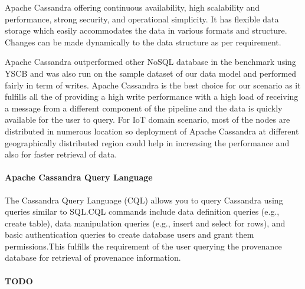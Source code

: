 Apache Cassandra offering continuous availability, high scalability and performance, strong security, and operational simplicity. It has flexible data storage which easily accommodates the data in various formats and structure. Changes can be made dynamically to the data structure as per requirement.


Apache Cassandra outperformed other NoSQL database in the benchmark using YSCB and was also run on the sample dataset of our data model and performed fairly in term of writes. 
Apache Cassandra is the best choice for our scenario as it fulfills all the of providing a high write performance with a high load of receiving a message from a different component of the pipeline and the data is quickly available for the user to query. For IoT domain scenario, most of the nodes are distributed in numerous location so deployment of Apache Cassandra at different geographically distributed region could help in increasing the performance and also for faster retrieval of data.

\paragraph*{Apache Cassandra Query Language}
The Cassandra Query Language (CQL) allows you to query Cassandra using queries similar to SQL.CQL commands include data definition queries (e.g., create table), data manipulation queries (e.g., insert and select for rows), and basic authentication queries to create database users and grant them permissions.This fulfills the requirement of the user querying the provenance database for retrieval of provenance information.




\paragraph*{TODO}




